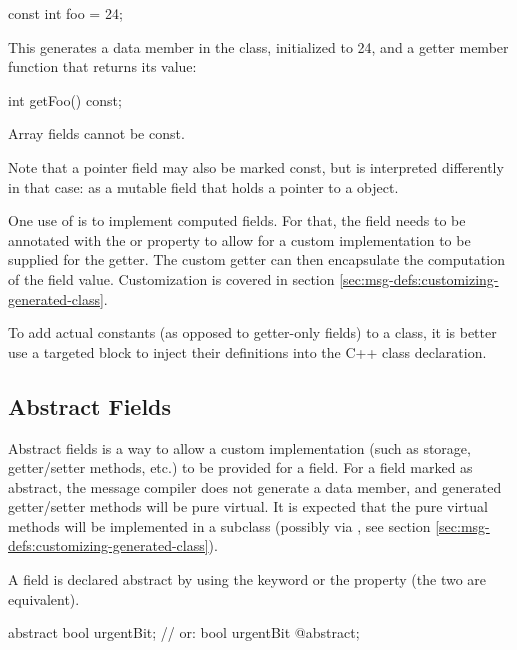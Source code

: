 \begin{msg}
const int foo = 24;
\end{msg}

This generates a  data member in the class, initialized to 24,
and a getter member function that returns its value:

\begin{cpp}
int getFoo() const;
\end{cpp}

Array fields cannot be const.

Note that a pointer field may also be marked const, but  is
interpreted differently in that case: as a mutable field that holds a pointer to
a  object.

One use of  is to implement computed fields. For that, the field
needs to be annotated with the  or  property
to allow for a custom implementation to be supplied for the getter. The custom
getter can then encapsulate the computation of the field value. Customization is
covered in section \ref{sec:msg-defs:customizing-generated-class}.

\begin{note}
To add actual constants (as opposed to getter-only fields) to a class, it
is better use a targeted  block to inject their definitions
into the C++ class declaration.
\end{note}


\subsection{Abstract Fields}
\label{sec:msg-defs:abstract-fields}

Abstract fields is a way to allow a custom implementation (such as storage,
getter/setter methods, etc.) to be provided for a field. For a field marked as
abstract, the message compiler does not generate a data member, and generated
getter/setter methods will be pure virtual. It is expected that the pure virtual
methods will be implemented in a subclass (possibly via , see
section \ref{sec:msg-defs:customizing-generated-class}).

A field is declared abstract by using the  keyword or the
 property (the two are equivalent).

\begin{msg}
abstract bool urgentBit; // or: bool urgentBit @abstract;
\end{msg}

